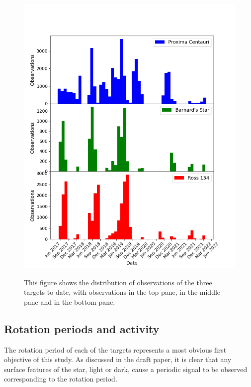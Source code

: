 \begin{figure}[!htbp]
\begin{center}
\includegraphics[scale=0.60]{images/rdwarfhist.png} \\
\end{center}
\caption{This figure shows the distribution of observations of the three
{\rdwarf} targets to date, with {\prox} observations in the top pane, {\bstar}
in the middle pane and {\ross} in the bottom pane.}
\protect\label{fig:rdwarfhist}
\end{figure}

\subsection{Rotation periods and activity}
\protect\label{section:rotact}

The rotation period of each of the targets represents a most obvious
first objective of this study. As discussed in the draft paper, it is clear that
any surface features of the star, light or dark, cause a periodic signal to be
observed corresponding to the rotation period.

